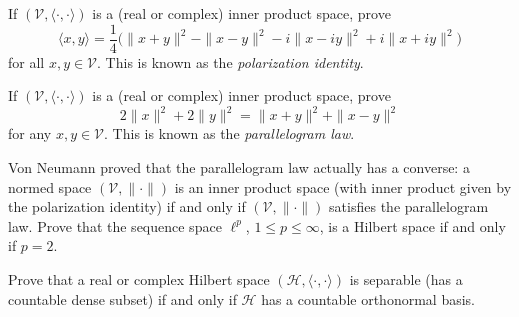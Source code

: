 \documentclass[12pt,letterpaper,cm]{hmcpset}
\begin{document}
\begin{problem}[1]
    If $(\mathcal{V},\langle\cdot,\cdot\rangle)$ is a (real or complex) inner product space, prove
    \[
        \langle x,y \rangle = \frac{1}{4}\bigl(\|x+y\|^2 - \|x-y\|^2 - i\|x-iy\|^2 + i\|x+iy\|^2\bigr)
    \]
    for all $x,y\in\mathcal{V}$. This is known as the \emph{polarization identity}.
\end{problem}

\begin{solution}
    \vfill
\end{solution}

\begin{problem}[2]
    If $(\mathcal{V},\langle\cdot,\cdot\rangle)$ is a (real or complex) inner product space, prove
    \[
        2\|x\|^2 + 2\|y\|^2 = \|x+y\|^2 + \|x-y\|^2
    \]
    for any $x,y\in\mathcal{V}$. This is known as the \emph{parallelogram law}.
\end{problem}

\begin{solution}
    \vfill
\end{solution}

\begin{problem}[3]
    Von Neumann proved that the parallelogram law actually has a converse: a normed
    space $(\mathcal{V},\|\cdot\|)$ is an inner product space (with inner product given
    by the polarization identity) if and only if $(\mathcal{V},\|\cdot\|)$ satisfies the
    parallelogram law. Prove that the sequence space $\ell^p$, $1\leq p \leq \infty$,
    is a Hilbert space if and only if $p=2$.
\end{problem}

\begin{solution}
    \vfill
\end{solution}

\begin{problem}[4]
    Prove that a real or complex Hilbert space $(\mathcal{H},\langle \cdot,\cdot \rangle)$ is separable
    (has a countable dense subset) if and only if $\mathcal{H}$ has a countable
    orthonormal basis.
\end{problem}

\begin{solution}
    \vfill
\end{solution}
\end{document}
